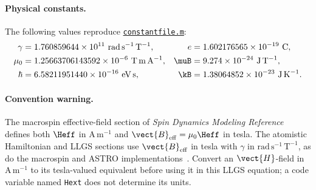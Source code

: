 \paragraph{Physical constants.}
The following values reproduce
\href{https://github.com/zhuzibn/general/blob/master/constant/constantfile.m}%
{\texttt{constantfile.m}}:
\begin{align*}
    \gamma &= 1.760859644\times10^{11}\ \mathrm{rad\,s^{-1}\,T^{-1}},
    & e &= 1.602176565\times10^{-19}\ \mathrm{C}, \\
    \mu_0 &= 1.25663706143592\times10^{-6}\ \mathrm{T\,m\,A^{-1}},
    & \muB &= 9.274\times10^{-24}\ \mathrm{J\,T^{-1}}, \\
    \hbar &= 6.58211951440\times10^{-16}\ \mathrm{eV\,s},
    & \kB &= 1.38064852\times10^{-23}\ \mathrm{J\,K^{-1}}.
\end{align*}

\paragraph{Convention warning.}
The macrospin effective-field section of \emph{Spin Dynamics Modeling Reference}
defines both $\Heff$ in $\mathrm{A\,m^{-1}}$ and
$\vect{B}_{\mathrm{eff}}=\mu_0\Heff$ in tesla.
The atomistic Hamiltonian and LLGS sections use $\vect{B}_{\mathrm{eff}}$ in
tesla with $\gamma$ in $\mathrm{rad\,s^{-1}\,T^{-1}}$, as do the macrospin and
ASTRO implementations~\cite{ode-llg-code,astro-code}.  Convert an $\vect{H}$-field in
$\mathrm{A\,m^{-1}}$ to its tesla-valued equivalent before using it in this
LLGS equation; a code variable named \texttt{Hext} does not determine its units.
